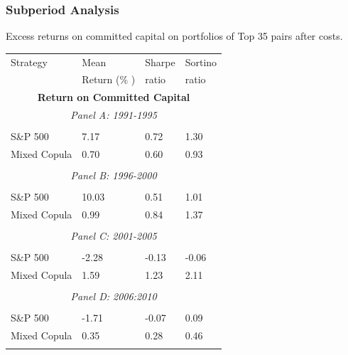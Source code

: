 \documentclass[pdf,9pt,xcolor=dvipsnames,hide notes]{beamer}
\begin{document}
\begin{frame}

\frametitle{Subperiod Analysis}
\begin{threeparttable}[H]
	\centering \tiny
	\caption{Excess returns on committed capital on portfolios of Top 35 pairs after costs. }
	\begin{tabularx}{\textwidth}{@{\extracolsep{\fill}}llll@{}}
		\toprule
		Strategy & Mean  & Sharpe & Sortino \\
		& Return (\% ) & ratio &  ratio     \\
		\midrule
		\multicolumn{4}{c}{\textbf{Return on Committed Capital}} \\
		\multicolumn{4}{c}{\textit{Panel A: 1991-1995}} \\
		&       &       &       \\
		S\&P 500 & 7.17  & 0.72  & 1.30 \\
		Mixed Copula & 0.70  & 0.60  & 0.93 \\
		\multicolumn{1}{r}{} & \multicolumn{1}{r}{} & \multicolumn{1}{r}{} & \multicolumn{1}{r}{} \\
		\multicolumn{4}{c}{\textit{Panel B: 1996-2000}} \\
		&       &       &       \\
		S\&P 500 & 10.03  & 0.51  & 1.01 \\
		Mixed Copula & 0.99  & 0.84  & 1.37 \\
		\multicolumn{1}{r}{} & \multicolumn{1}{r}{} & \multicolumn{1}{r}{} & \multicolumn{1}{r}{} \\
		\multicolumn{4}{c}{\textit{Panel C: 2001-2005}} \\
		&       &       &       \\
		S\&P 500 & -2.28  & \cellcolor{Melon} -0.13  & -0.06 \\
		Mixed Copula & 1.59  & \cellcolor{corn} 1.23  & 2.11 \\
		\multicolumn{1}{r}{} & \multicolumn{1}{r}{} & \multicolumn{1}{r}{} & \multicolumn{1}{r}{} \\
		\multicolumn{4}{c}{\textit{Panel D: 2006:2010}} \\
		&       &       &       \\
		S\&P 500 & -1.71  & \cellcolor{Melon} -0.07  & 0.09 \\
		Mixed Copula & 0.35  & \cellcolor{corn} 0.28  & 0.46 \\
		\multicolumn{1}{r}{} & \multicolumn{1}{r}{} & \multicolumn{1}{r}{} & \multicolumn{1}{r}{} \\

\end{tabularx}
\end{threeparttable}
\end{frame}
\end{document}

